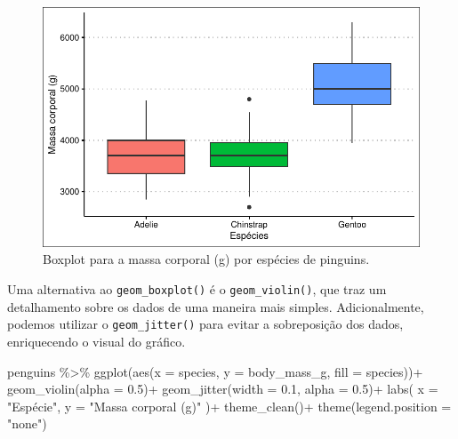 \documentclass[
  12pt,
  letterpaper,
  DIV=11,
  numbers=noendperiod]{scrreprt}
\newenvironment{Shaded}{\begin{snugshade}}{\end{snugshade}}
\newcommand{\AttributeTok}[1]{\textcolor[rgb]{0.40,0.45,0.13}{#1}}
\newcommand{\FloatTok}[1]{\textcolor[rgb]{0.68,0.00,0.00}{#1}}
\newcommand{\FunctionTok}[1]{\textcolor[rgb]{0.28,0.35,0.67}{#1}}
\newcommand{\NormalTok}[1]{\textcolor[rgb]{0.00,0.23,0.31}{#1}}
\newcommand{\SpecialCharTok}[1]{\textcolor[rgb]{0.37,0.37,0.37}{#1}}
\newcommand{\StringTok}[1]{\textcolor[rgb]{0.13,0.47,0.30}{#1}}
\theoremstyle{definition}
\theoremstyle{exemplo}
\begin{document}
\begin{figure}[H]

{\centering \includegraphics{03-tidyverse_files/figure-pdf/unnamed-chunk-28-1.pdf}

}

\caption{Boxplot para a massa corporal (g) por espécies de pinguins.}

\end{figure}%

Uma alternativa ao \texttt{geom\_boxplot()} é o \texttt{geom\_violin()},
que traz um detalhamento sobre os dados de uma maneira mais simples.
Adicionalmente, podemos utilizar o \texttt{geom\_jitter()} para evitar a
sobreposição dos dados, enriquecendo o visual do gráfico.

\begin{Shaded}
\begin{Highlighting}[]
\NormalTok{penguins }\SpecialCharTok{\%\textgreater{}\%} 
  \FunctionTok{ggplot}\NormalTok{(}\FunctionTok{aes}\NormalTok{(}\AttributeTok{x =}\NormalTok{ species, }\AttributeTok{y =}\NormalTok{ body\_mass\_g, }\AttributeTok{fill =}\NormalTok{ species))}\SpecialCharTok{+}
    \FunctionTok{geom\_violin}\NormalTok{(}\AttributeTok{alpha =} \FloatTok{0.5}\NormalTok{)}\SpecialCharTok{+}
    \FunctionTok{geom\_jitter}\NormalTok{(}\AttributeTok{width =} \FloatTok{0.1}\NormalTok{, }\AttributeTok{alpha =} \FloatTok{0.5}\NormalTok{)}\SpecialCharTok{+}
    \FunctionTok{labs}\NormalTok{(}
      \AttributeTok{x =} \StringTok{"Espécie"}\NormalTok{,}
      \AttributeTok{y =} \StringTok{"Massa corporal (g)"}
\NormalTok{    )}\SpecialCharTok{+}
    \FunctionTok{theme\_clean}\NormalTok{()}\SpecialCharTok{+}
    \FunctionTok{theme}\NormalTok{(}\AttributeTok{legend.position =} \StringTok{"none"}\NormalTok{)}
\end{Highlighting}
\end{Shaded}
\end{document}

